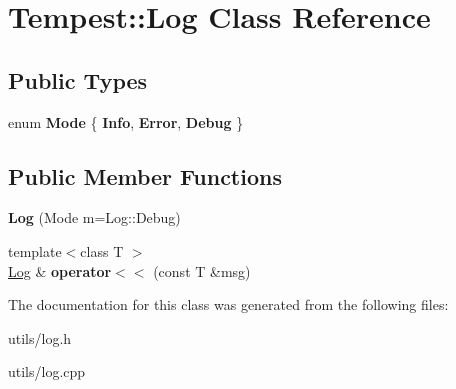 \hypertarget{class_tempest_1_1_log}{\section{Tempest\+:\+:Log Class Reference}
\label{class_tempest_1_1_log}
}
\subsection*{Public Types}
\begin{DoxyCompactItemize}
\item 
\hypertarget{class_tempest_1_1_log_a8c6089035592d7ad4121541fbd8b161f}{enum {\bfseries Mode} \{ {\bfseries Info}, 
{\bfseries Error}, 
{\bfseries Debug}
 \}}\label{class_tempest_1_1_log_a8c6089035592d7ad4121541fbd8b161f}

\end{DoxyCompactItemize}
\subsection*{Public Member Functions}
\begin{DoxyCompactItemize}
\item 
\hypertarget{class_tempest_1_1_log_a1e0e5ee5b39146fd5d8d1c1d59d00a60}{{\bfseries Log} (Mode m=Log\+::\+Debug)}\label{class_tempest_1_1_log_a1e0e5ee5b39146fd5d8d1c1d59d00a60}

\item 
\hypertarget{class_tempest_1_1_log_ae81f0a4122ccacd2bd553e525d98459f}{{\footnotesize template$<$class T $>$ }\\\hyperlink{class_tempest_1_1_log}{Log} \& {\bfseries operator$<$$<$} (const T \&msg)}\label{class_tempest_1_1_log_ae81f0a4122ccacd2bd553e525d98459f}

\end{DoxyCompactItemize}


The documentation for this class was generated from the following files\+:\begin{DoxyCompactItemize}
\item 
utils/log.\+h\item 
utils/log.\+cpp\end{DoxyCompactItemize}
